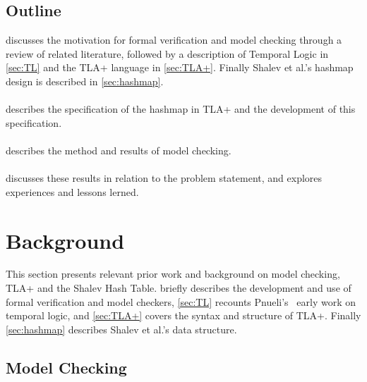 \documentclass{uit-thesis}
\begin{document}
\section{Outline}
\textbf{} discusses the motivation for formal verification and model checking through a review of related literature, followed by a description of Temporal Logic in \autoref{sec:TL} and the TLA+ language in \autoref{sec:TLA+}. Finally Shalev et al.'s hashmap design is described in \autoref{sec:hashmap}.
\\\\
\textbf{} describes the specification of the hashmap in TLA+ and the development of this specification.
\\\\
\textbf{} describes the method and results of model checking.
\\\\
\textbf{} discusses these results in relation to the problem statement, and explores experiences and lessons lerned.

\chapter{Background}\label{ch:background}
This section presents relevant prior work and background on model checking, TLA+ and the Shalev Hash Table.  briefly describes the development and use of formal verification and model checkers, \autoref{sec:TL} recounts Pnueli's~\cite{Pnueli1977} early work on temporal logic, and \autoref{sec:TLA+} covers the syntax and structure of TLA+. Finally \autoref{sec:hashmap} describes Shalev et al.'s data structure.

\section{Model Checking}\label{sec:model-checking}
\end{document}
